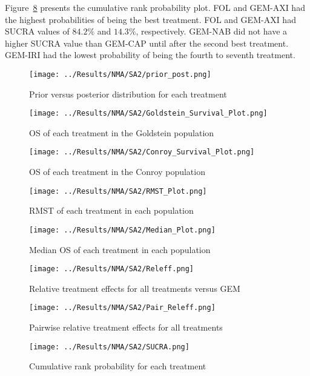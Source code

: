 Figure~\ref{fig:sucra_SA2} presents the cumulative rank probability plot. FOL and GEM-AXI had the highest probabilities of being the best treatment. FOL and GEM-AXI had SUCRA values of $84.2\%$ and $14.3\%$, respectively. GEM-NAB did not have a higher SUCRA value than GEM-CAP until after the second best treatment. GEM-IRI had the lowest probability of being the fourth to seventh treatment. 

\begin{figure}[h]
    \centering
    \texttt{[image: ../Results/NMA/SA2/prior\_post.png]}
    \caption{Prior versus posterior distribution for each treatment}
    \label{fig:prior_post_SA2}
\end{figure}

\begin{figure}[h]
    \centering
    \texttt{[image: ../Results/NMA/SA2/Goldstein\_Survival\_Plot.png]}
    \caption{OS of each treatment in the Goldstein population}
    \label{fig:pred_surv_goldstein_SA2}
\end{figure}

\begin{figure}[h]
    \centering
    \texttt{[image: ../Results/NMA/SA2/Conroy\_Survival\_Plot.png]}
    \caption{OS of each treatment in the Conroy population}
    \label{fig:pred_surv_conroy_SA2}
\end{figure}

\begin{figure}[h]
    \centering
    \texttt{[image: ../Results/NMA/SA2/RMST\_Plot.png]}
    \caption{RMST of each treatment in each population}
    \label{fig:pred_rmst_SA2}
\end{figure}

\begin{figure}[h]
    \centering
    \texttt{[image: ../Results/NMA/SA2/Median\_Plot.png]}
    \caption{Median OS of each treatment in each population}
    \label{fig:pred_median_SA2}
\end{figure}

\begin{figure}[h]
    \centering
    \texttt{[image: ../Results/NMA/SA2/Releff.png]}
    \caption{Relative treatment effects for all treatments versus GEM}
    \label{fig:releff_SA2}
\end{figure}

\begin{figure}[h]
    \centering
    \texttt{[image: ../Results/NMA/SA2/Pair\_Releff.png]}
    \caption{Pairwise relative treatment effects for all treatments}
    \label{fig:pair_releff_SA2}
\end{figure}

\begin{figure}[h]
    \centering
    \texttt{[image: ../Results/NMA/SA2/SUCRA.png]}
    \caption{Cumulative rank probability for each treatment}
    \label{fig:sucra_SA2}
\end{figure}